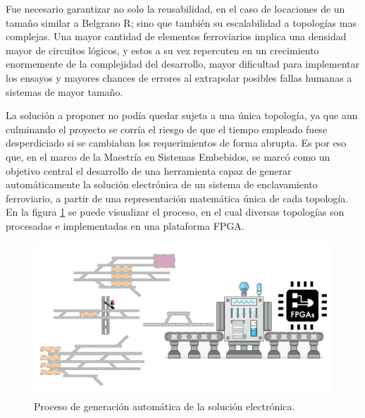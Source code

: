 				
		Fue necesario garantizar no solo la reusabilidad, en el caso de locaciones de un tamaño similar a Belgrano R; sino que también su escalabilidad a topologías mas complejas. Una mayor cantidad de elementos ferroviarios implica una densidad mayor de circuitos lógicos, y estos a su vez repercuten en un crecimiento enormemente de la complejidad del desarrollo, mayor dificultad para implementar los ensayos y mayores chances de errores al extrapolar posibles fallas humanas a sistemas de mayor tamaño.
		
		La solución a proponer no podía quedar sujeta a una única topología, ya que aun culminando el proyecto se corría el riesgo de que el tiempo empleado fuese desperdiciado si se cambiaban los requerimientos de forma abrupta. Es por eso que, en el marco de la Maestría en Sistemas Embebidos, se marcó como un objetivo central el desarrollo de una herramienta capaz de generar automáticamente la solución electrónica de un sistema de enclavamiento ferroviario, a partir de una representación matemática única de cada topología. En la figura \ref{fig:Generacion} se puede visualizar el proceso, en el cual diversas topologías son procesadas e implementadas en una plataforma FPGA.
				
		\begin{figure}[htbp!]
			\centering
			\includegraphics[scale=.45]{./Figures/Generacion}
			\caption{Proceso de generación automática de la solución electrónica.}
			\label{fig:Generacion}
		\end{figure}
		
		\vspace{10cm}
		
		
